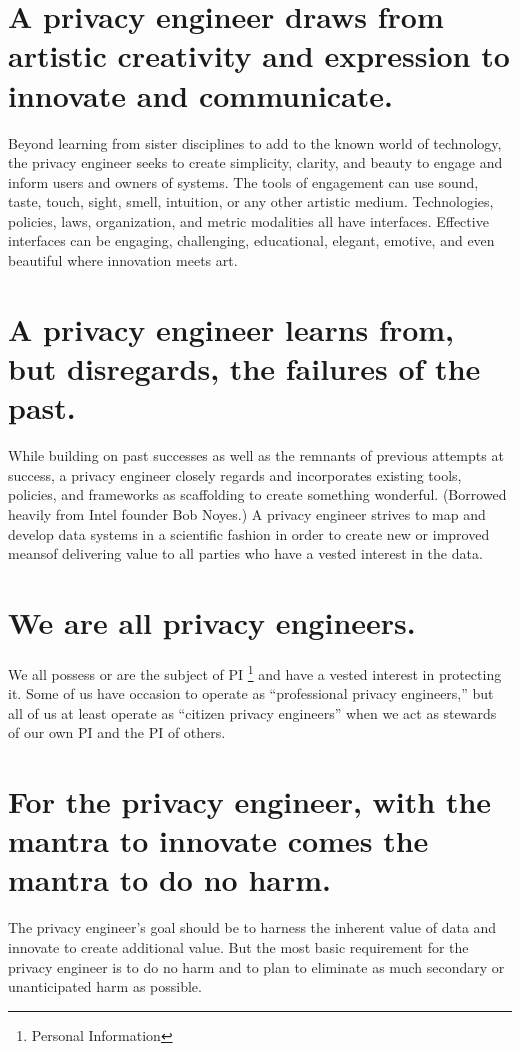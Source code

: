 \documentclass[letterpaper,12pt,english]{sphinxmanual}
\begin{document}
\section{A privacy engineer draws from artistic creativity and expression to innovate and communicate.}
\label{privacy:a-privacy-engineer-draws-from-artistic-creativity-and-expression-to-innovate-and-communicate}
Beyond learning from sister disciplines to add to the known world of technology, the privacy engineer seeks to create simplicity, clarity, and beauty to engage and inform users and owners of systems. The tools of engagement can use sound, taste, touch, sight, smell, intuition, or any other artistic medium. Technologies, policies, laws, organization, and metric modalities all have interfaces. Effective interfaces can be engaging, challenging, educational, elegant, emotive, and even beautiful where innovation meets art.


\section{A privacy engineer learns from, but disregards, the failures of the past.}
\label{privacy:a-privacy-engineer-learns-from-but-disregards-the-failures-of-the-past}
While building on past successes as well as the remnants of previous attempts at success, a privacy engineer closely regards and incorporates existing tools, policies, and frameworks as scaffolding to create something wonderful. (Borrowed heavily from Intel founder Bob Noyes.) A privacy engineer strives to map and develop data systems in a scientific fashion in order to create new or improved meansof delivering value to all parties who have a vested interest in the data.


\section{We are all privacy engineers.}
\label{privacy:we-are-all-privacy-engineers}
We all possess or are the subject of PI \footnote[2]{\sphinxAtStartFootnote%
Personal Information
} and have a vested interest in protecting it. Some of us have occasion to operate as “professional privacy engineers,” but all of us at least operate as “citizen privacy engineers” when we act as stewards of our own PI and the PI of others.


\section{For the privacy engineer, with the mantra to innovate comes the mantra to do no harm.}
\label{privacy:for-the-privacy-engineer-with-the-mantra-to-innovate-comes-the-mantra-to-do-no-harm}
The privacy engineer’s goal should be to harness the inherent value of data and innovate to create additional value. But the most basic requirement for the privacy engineer is to do no harm and to plan to eliminate as much secondary or unanticipated harm as possible.
\end{document}
